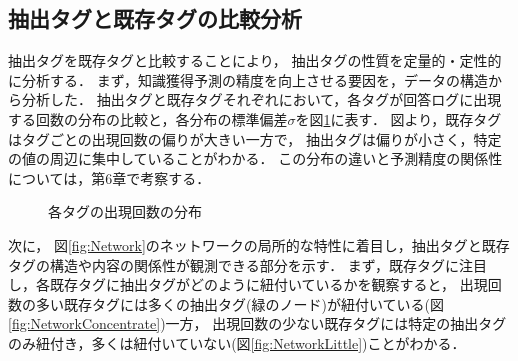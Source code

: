 \subsection{抽出タグと既存タグの比較分析}
抽出タグを既存タグと比較することにより，
抽出タグの性質を定量的・定性的に分析する．
まず，知識獲得予測の精度を向上させる要因を，データの構造から分析した．
抽出タグと既存タグそれぞれにおいて，各タグが回答ログに出現する回数の分布の比較と，各分布の標準偏差$\sigma$を図\ref{fig:AppearHist}に表す．
図より，既存タグはタグごとの出現回数の偏りが大きい一方で，
抽出タグは偏りが小さく，特定の値の周辺に集中していることがわかる．
この分布の違いと予測精度の関係性については，第6章で考察する．
\begin{figure}[H]
\begin{center}
\hspace*{-20pt}
\end{center}
\caption{各タグの出現回数の分布}
\label{fig:AppearHist}
\end{figure}


次に，
図\ref{fig:Network}のネットワークの局所的な特性に着目し，抽出タグと既存タグの構造や内容の関係性が観測できる部分を示す．
まず，既存タグに注目し，各既存タグに抽出タグがどのように紐付いているかを観察すると，
出現回数の多い既存タグには多くの抽出タグ(緑のノード)が紐付いている(図\ref{fig:NetworkConcentrate})一方，
出現回数の少ない既存タグには特定の抽出タグのみ紐付き，多くは紐付いていない(図\ref{fig:NetworkLittle})ことがわかる．

